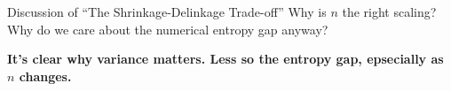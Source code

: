 \documentclass[8pt]{beamer}\usepackage[]{graphicx}\usepackage[]{color}
\begin{document}
\begin{frame}{Discussion of ``The Shrinkage-Delinkage Trade-off''}
\pause
Why is $n$ the right scaling?  Why do we care about the numerical entropy gap anyway?

\textbf{It's clear why variance matters.  Less so the entropy gap,
epsecially as $n$ changes.}




\end{frame}




    
%     
%     
    
\end{document}
